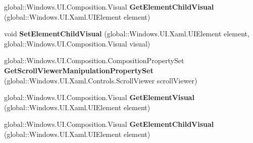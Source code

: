 \begin{DoxyCompactItemize}
\item 
\mbox{\label{interface_windows_1_1_u_i_1_1_xaml_1_1_hosting_1_1_i_element_composition_preview_statics_a5c60a91c9c5c8f2c885579f65b715542}} 
global\+::\+Windows.\+U\+I.\+Composition.\+Visual {\bfseries Get\+Element\+Child\+Visual} (global\+::\+Windows.\+U\+I.\+Xaml.\+U\+I\+Element element)
\item 
\mbox{\label{interface_windows_1_1_u_i_1_1_xaml_1_1_hosting_1_1_i_element_composition_preview_statics_ae6c5a85d72b3bb334c01c89b54803023}} 
void {\bfseries Set\+Element\+Child\+Visual} (global\+::\+Windows.\+U\+I.\+Xaml.\+U\+I\+Element element, global\+::\+Windows.\+U\+I.\+Composition.\+Visual visual)
\item 
\mbox{\label{interface_windows_1_1_u_i_1_1_xaml_1_1_hosting_1_1_i_element_composition_preview_statics_ab27d5dea22cc21e23a4eb65c45a18223}} 
global\+::\+Windows.\+U\+I.\+Composition.\+Composition\+Property\+Set {\bfseries Get\+Scroll\+Viewer\+Manipulation\+Property\+Set} (global\+::\+Windows.\+U\+I.\+Xaml.\+Controls.\+Scroll\+Viewer scroll\+Viewer)
\item 
\mbox{\label{interface_windows_1_1_u_i_1_1_xaml_1_1_hosting_1_1_i_element_composition_preview_statics_ae2b37785a6d7aebf56292ef6ef4b23c8}} 
global\+::\+Windows.\+U\+I.\+Composition.\+Visual {\bfseries Get\+Element\+Visual} (global\+::\+Windows.\+U\+I.\+Xaml.\+U\+I\+Element element)
\item 
\mbox{\label{interface_windows_1_1_u_i_1_1_xaml_1_1_hosting_1_1_i_element_composition_preview_statics_a5c60a91c9c5c8f2c885579f65b715542}} 
global\+::\+Windows.\+U\+I.\+Composition.\+Visual {\bfseries Get\+Element\+Child\+Visual} (global\+::\+Windows.\+U\+I.\+Xaml.\+U\+I\+Element element)
\item 
\mbox{\label{interface_windows_1_1_u_i_1_1_xaml_1_1_hosting_1_1_i_element_composition_preview_statics_ae6c5a85d72b3bb334c01c89b54803023}} 

\end{DoxyCompactItemize}
